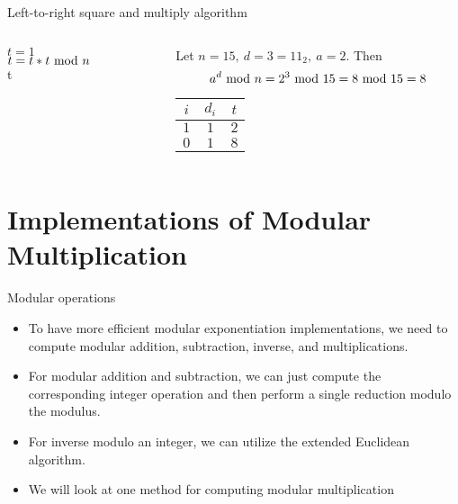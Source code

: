 \begin{frame}{Left-to-right square and multiply algorithm}
\begin{columns}[T] %
\begin{column}{.4\textwidth}
{
\setlength{\interspacetitleruled}{0pt}%
\setlength{\algotitleheightrule}{0pt}%
\begin{algorithm}[H]
$t = 1$\\
 	{
  	$t=t*t\textrm{~mod~} n$\\
  	}
  	\Return t
\end{algorithm}
}
\end{column}%
\hfill%
\begin{column}{.6\textwidth}
\begin{example}
    Let $n=15,\ d=3=11_2,\  a=2$.
    Then
    \[
    a^d\textrm{~mod~} n=2^3\textrm{~mod~}15=8\textrm{~mod~}15=8
    \]
 \begin{center}
        \begin{tabular}{c|c|c}
     $i$ & $d_i$  &  $t$  \\\hline
     $1$ & $1$    &  $2$  \\
     $0$ & $1$    &  $8$  
    \end{tabular}
    \end{center}
\end{example}
\end{column}%
\end{columns}
\end{frame}

\section{Implementations of Modular Multiplication}
\begin{frame}{\VideoName}
    \tableofcontents[currentsection]
\end{frame}

\begin{frame}{Modular operations}
    \begin{itemize}
        \item To have more efficient modular exponentiation implementations, we need to compute modular addition, subtraction, inverse, and multiplications.
        \item For modular addition and subtraction, we can just compute the corresponding integer operation and then perform a single reduction modulo the modulus.
        \item For inverse modulo an integer, we can utilize the extended Euclidean algorithm.
        \item We will look at one method for computing modular multiplication
    \end{itemize}
\end{frame}

